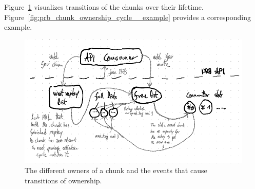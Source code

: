 \documentclass[12pt,a4paper,twoside]{book}
\begin{document}
{Figure~\ref{fig:prb_chunk_ownership_cycle__transitions} visualizes transitions of the chunks over their lifetime.
Figure~\ref{fig:prb_chunk_ownership_cycle__example} provides a corresponding example.

\begin{figure}[H]
    \centering
    \includegraphics{fig/prb_chunk_ownership_cycle__transitions}
    \caption{The different owners of a chunk and the events that cause transitions of ownership.}
    \label{fig:prb_chunk_ownership_cycle__transitions}
\end{figure}

}
\end{document}
